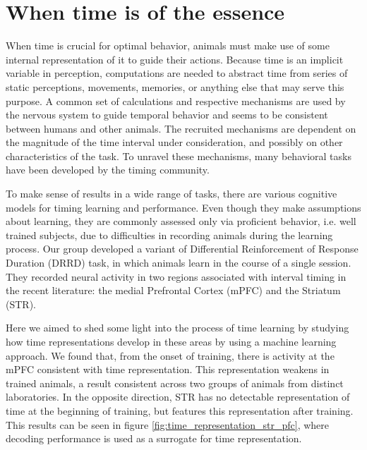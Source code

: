 \chapter{When time is of the essence}
    When time is crucial for optimal behavior, animals must make use of some internal representation of it to guide their actions. Because time is an implicit variable in perception, computations are needed to abstract time from series of static perceptions, movements, memories, or anything else that may serve this purpose. A common set of calculations and respective mechanisms are used by the nervous system to guide temporal behavior and seems to be consistent between humans and other animals. The recruited mechanisms are dependent on the magnitude of the time interval under consideration, and possibly on other characteristics of the task. To unravel these mechanisms, many behavioral tasks have been developed by the timing community.

    To make sense of results in a wide range of tasks, there are various cognitive models for timing learning and performance. Even though they make assumptions about learning, they are commonly assessed only via proficient behavior, i.e. well trained subjects, due to difficulties in recording animals during the learning process. Our group developed a variant of Differential Reinforcement of Response Duration (DRRD) task, in which animals learn in the course of a single session. They recorded neural activity in two regions associated with interval timing in the recent literature: the medial Prefrontal Cortex (mPFC) and the Striatum (STR). 
    
    Here we aimed to shed some light into the process of time learning by studying how time representations develop in these areas by using a machine learning approach. We found that, from the onset of training, there is activity at the mPFC consistent with time representation. This representation weakens in trained animals, a result consistent across two groups of animals from distinct laboratories. In the opposite direction, STR has no detectable representation of time at the beginning of training, but features this representation after training. This results can be seen in figure \ref{fig:time_representation_str_pfc}, where decoding performance is used as a surrogate for time representation.
    

